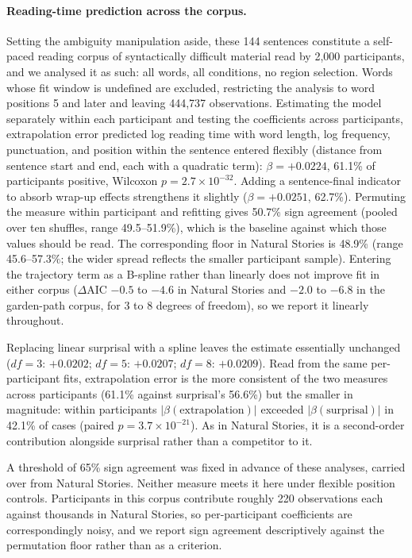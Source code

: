 \documentclass[12pt]{article}
\begin{document}
{\paragraph{Reading-time prediction across the corpus.} Setting the ambiguity manipulation aside, these 144 sentences constitute a self-paced reading corpus of syntactically difficult material read by 2,000 participants, and we analysed it as such: all words, all conditions, no region selection. Words whose fit window is undefined are excluded, restricting the analysis to word positions 5 and later and leaving 444,737 observations. Estimating the model separately within each participant and testing the coefficients across participants, extrapolation error predicted log reading time with word length, log frequency, punctuation, and position within the sentence entered flexibly (distance from sentence start and end, each with a quadratic term): $\beta = +0.0224$, 61.1\% of participants positive, Wilcoxon $p = 2.7 \times 10^{-32}$. Adding a sentence-final indicator to absorb wrap-up effects strengthens it slightly ($\beta = +0.0251$, 62.7\%). Permuting the measure within participant and refitting gives 50.7\% sign agreement (pooled over ten shuffles, range 49.5--51.9\%), which is the baseline against which those values should be read. The corresponding floor in Natural Stories is 48.9\% (range 45.6--57.3\%; the wider spread reflects the smaller participant sample). Entering the trajectory term as a B-spline rather than linearly does not improve fit in either corpus ($\Delta$AIC $-0.5$ to $-4.6$ in Natural Stories and $-2.0$ to $-6.8$ in the garden-path corpus, for 3 to 8 degrees of freedom), so we report it linearly throughout.

Replacing linear surprisal with a spline leaves the estimate essentially unchanged ($df = 3$: $+0.0202$; $df = 5$: $+0.0207$; $df = 8$: $+0.0209$). Read from the same per-participant fits, extrapolation error is the more consistent of the two measures across participants (61.1\% against surprisal's 56.6\%) but the smaller in magnitude: within participants $|\beta(\text{extrapolation})|$ exceeded $|\beta(\text{surprisal})|$ in 42.1\% of cases (paired $p = 3.7 \times 10^{-21}$). As in Natural Stories, it is a second-order contribution alongside surprisal rather than a competitor to it.

A threshold of 65\% sign agreement was fixed in advance of these analyses, carried over from Natural Stories. Neither measure meets it here under flexible position controls. Participants in this corpus contribute roughly 220 observations each against thousands in Natural Stories, so per-participant coefficients are correspondingly noisy, and we report sign agreement descriptively against the permutation floor rather than as a criterion.

}
\end{document}
